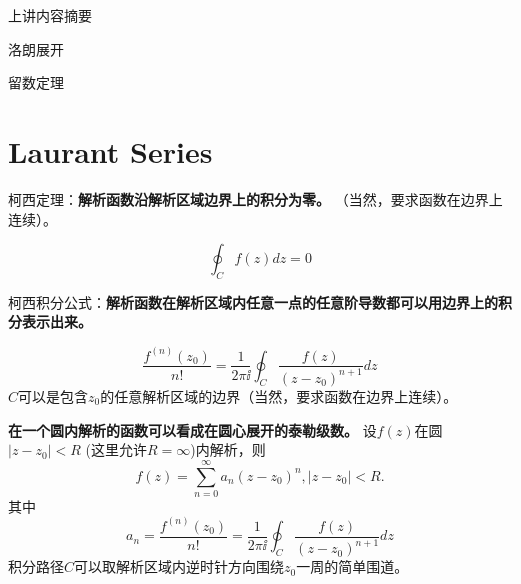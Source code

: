 \documentclass[CJK]{beamer}
\date{}
\begin{document}


\begin{frame}
\bch
\bitem
\item{上讲内容摘要}
\item{洛朗展开}
\item{留数定理}
\eitem
\ech
\end{frame}


\section{Laurant Series}

\begin{frame}
  \bch
  柯西定理：{\bf \blue 解析函数沿解析区域边界上的积分为零。}
  （当然，要求函数在边界上连续）。
  

  $$\oint_C f(z) dz  = 0 $$
  \ech
\end{frame}


\begin{frame}
  \bch
  柯西积分公式：{\bf \blue 解析函数在解析区域内任意一点的任意阶导数都可以用边界上的积分表示出来。}
  
  $$\frac{f^{(n)}(z_0)}{n!} =  \frac{1}{2\pi \ii}\oint_C \frac{f(z)}{(z-z_0)^{n+1}}dz$$
  $C$可以是包含$z_0$的任意解析区域的边界（当然，要求函数在边界上连续）。
  \ech
\end{frame}

\begin{frame}
  \bch
  {\bf \blue 在一个圆内解析的函数可以看成在圆心展开的泰勒级数。}
  设$f(z)$在圆$|z-z_0|<R$ (这里允许$R=\infty$)内解析，则
  $$f(z) = \sum_{n=0}^{\infty} a_n (z-z_0)^n, |z-z_0|<R.$$
  其中
  $$a_n = \frac{f^{(n)}(z_0)}{n!} =  \frac{1}{2\pi \ii}\oint_C \frac{f(z)}{(z-z_0)^{n+1}}dz$$
  积分路径$C$可以取解析区域内逆时针方向围绕$z_0$一周的简单围道。
  \ech
\end{frame}
\end{document}
